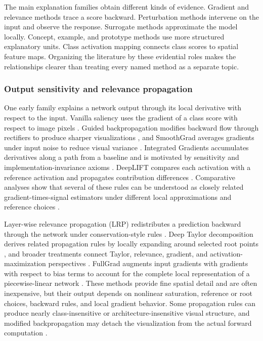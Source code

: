 The main explanation families obtain different kinds of evidence. Gradient
and relevance methods trace a score backward. Perturbation methods intervene
on the input and observe the response. Surrogate methods approximate the model
locally. Concept, example, and prototype methods use more structured
explanatory units. Class activation mapping connects class scores to spatial
feature maps. Organizing the literature by these evidential roles makes the
relationships clearer than treating every named method as a separate topic.

\subsubsection{Output sensitivity and relevance propagation}

One early family explains a network output through its local derivative with
respect to the input. Vanilla saliency uses the gradient of a class score with
respect to image pixels \cite{simonyan2014saliency}. Guided backpropagation
modifies backward flow through rectifiers to produce sharper visualizations
\cite{springenberg2015striving}, and SmoothGrad averages gradients under input
noise to reduce visual variance \cite{smilkov2017smoothgrad}. Integrated
Gradients accumulates derivatives along a path from a baseline and is motivated
by sensitivity and implementation-invariance axioms
\cite{sundararajan2017axiomatic}. DeepLIFT compares each activation with a
reference activation and propagates contribution differences
\cite{shrikumar2017deeplift}. Comparative analyses show that several of these
rules can be understood as closely related gradient-times-signal estimators
under different local approximations and reference choices
\cite{ancona2018gradient}.

Layer-wise relevance propagation (LRP) redistributes a prediction backward
through the network under conservation-style rules
\cite{bach2015pixelwise}. Deep Taylor decomposition derives related propagation
rules by locally expanding around selected root points
\cite{montavon2017deeptaylor}, and broader treatments connect Taylor,
relevance, gradient, and activation-maximization perspectives
\cite{montavon2018methods}. FullGrad augments input gradients with gradients
with respect to bias terms to account for the complete local representation of
a piecewise-linear network \cite{srinivas2019fullgrad}. These methods provide
fine spatial detail and are often inexpensive, but their output depends on
nonlinear saturation, reference or root choices, backward rules, and local
gradient behavior. Some propagation rules can produce nearly class-insensitive
or architecture-insensitive visual structure, and modified backpropagation may
detach the visualization from the actual forward computation
\cite{adebayo2018sanity,sixt2020explanationslie}.

